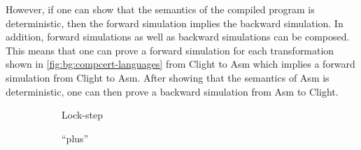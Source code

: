 However, if one can show that the semantics of the compiled program is
deterministic, then the forward simulation implies the backward simulation.
In addition, forward simulations as well as backward simulations can be
composed.  This means that one can prove a forward simulation for each
transformation shown in \cref{fig:bg:compcert-languages} from \gls{Clight} to
\gls{Asm} which implies a forward simulation from \gls{Clight} to \gls{Asm}.  After
showing that the semantics of \gls{Asm} is deterministic, one can then prove a
backward simulation from \gls{Asm} to \gls{Clight}.

\begin{figure}
  \centering
  \begin{subfigure}[b]{0.31\linewidth}
    \centering
    \caption{Lock-step}
  \end{subfigure}\hfill%
  \begin{subfigure}[b]{0.31\linewidth}
    \centering
    \caption{\enquote{plus}}
  \end{subfigure}\hfill%
  \begin{subfigure}[b]{0.31\linewidth}
    \centering
\end{subfigure}
\end{figure}
